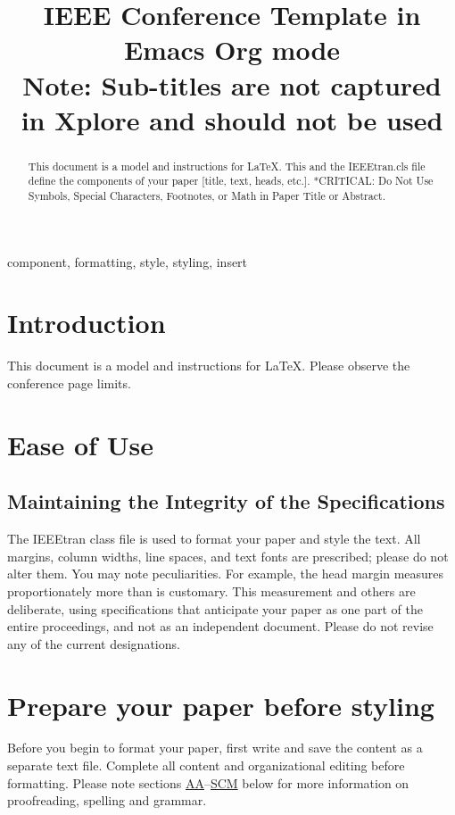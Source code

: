 \documentclass[conference]{IEEEtran}
\date{}
\title{IEEE Conference Template in Emacs Org mode\\\medskip
\large *Note: Sub-titles are not captured in Xplore and should not be used}
\begin{document}
\maketitle
\begin{abstract}
This document is a model and instructions for \LaTeX. This and the IEEEtran.cls file define the components of your paper [title, text, heads, etc.]. *CRITICAL: Do Not Use Symbols, Special Characters, Footnotes, or Math in Paper Title or Abstract.
\end{abstract}

 \begin{IEEEkeywords}
component, formatting, style, styling, insert
 \end{IEEEkeywords}

\section{Introduction}
\label{sec:orgc200983}
This document is a model and instructions for \LaTeX{}. Please observe the conference page limits.

\section{Ease of Use}
\label{sec:orgcd7145e}
\subsection{Maintaining the Integrity of the Specifications}
\label{sec:orga9301ae}
   The IEEEtran class file is used to format your paper and style the text. All margins, column widths, line spaces, and text fonts are prescribed; please do not alter them. You may note peculiarities. For example, the head margin
measures proportionately more than is customary. This measurement and others are deliberate, using specifications that anticipate your paper as one part of the entire proceedings, and not as an independent document. Please do not revise any of the current designations.

\section{Prepare your paper before styling}
\label{sec:org3d100ac}
Before you begin to format your paper, first write and save the content as a separate text file. Complete all content and organizational editing before formatting. Please note sections \hyperref[sec:org15269bc]{AA}--\hyperref[sec:org320f6bb]{SCM} below for more information on proofreading, spelling and grammar.
\end{document}
